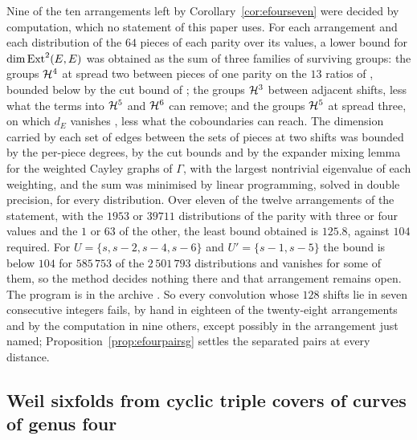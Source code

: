 \begin{remark}\label{rem:efourseven}
Nine of the ten arrangements left by Corollary~\ref{cor:efourseven} were decided by computation, which no statement of this paper uses. For each arrangement and each distribution of the $64$ pieces of each parity over its values, a lower bound for $\dim\mathrm{Ext}^{2}(E,E)$ was obtained as the sum of three families of surviving groups: the groups $\mathcal{H}^{4}$ at spread two between pieces of one parity on the $13$ ratios of \cite[Lemma~18.39(ii)]{BMB26}, bounded below by the cut bound of \cite[Lemma~18.40]{BMB26}; the groups $\mathcal{H}^{3}$ between adjacent shifts, less what the terms into $\mathcal{H}^{5}$ and $\mathcal{H}^{6}$ can remove; and the groups $\mathcal{H}^{5}$ at spread three, on which $d_{E}$ vanishes \cite[Lemma~18.39(iii)]{BMB26}, less what the coboundaries can reach. The dimension carried by each set of edges between the sets of pieces at two shifts was bounded by the per-piece degrees, by the cut bounds and by the expander mixing lemma for the weighted Cayley graphs of $\Gamma$, with the largest nontrivial eigenvalue of each weighting, and the sum was minimised by linear programming, solved in double precision, for every distribution. Over eleven of the twelve arrangements of the statement, with the $1953$ or $39711$ distributions of the parity with three or four values and the $1$ or $63$ of the other, the least bound obtained is $125.8$, against $104$ required. For $U=\{s,s-2,s-4,s-6\}$ and $U'=\{s-1,s-5\}$ the bound is below $104$ for $585\,753$ of the $2\,501\,793$ distributions and vanishes for some of them, so the method decides nothing there and that arrangement remains open. The program is in the archive \cite{BB26code}. So every convolution whose $128$ shifts lie in seven consecutive integers fails, by hand in eighteen of the twenty-eight arrangements and by the computation in nine others, except possibly in the arrangement just named; Proposition~\ref{prop:efourpairsg} settles the separated pairs at every distance.
\end{remark}

\subsection{Weil sixfolds from cyclic triple covers of curves of genus four}\label{ssec:genusfour}

